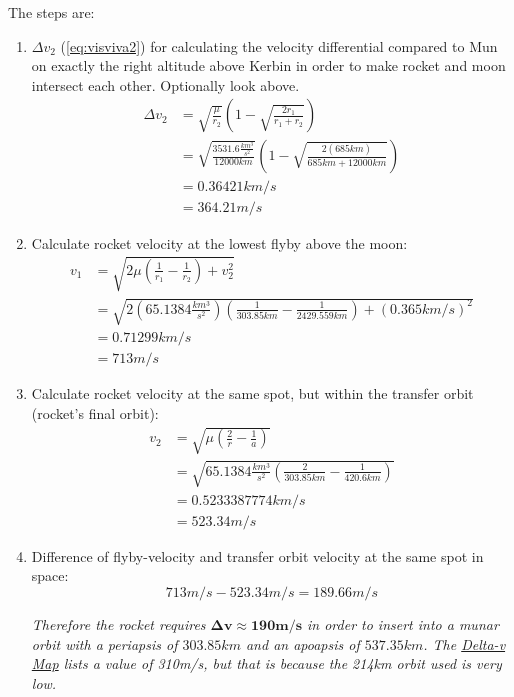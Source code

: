 \documentclass[12pt,paper=A4,numbers=noenddot,bibliography=totoc,listof=totoc,DIV=11,BCOR=1mm]{scrreprt}
\begin{document}
\begin{enumerate}
The steps are:\
	\begin{enumerate}
	\item $\Delta v_{2}$ (\ref{eq:visviva2}) for calculating the velocity differential compared to Mun on exactly the right altitude above Kerbin in order to make rocket and moon intersect each other. Optionally look above.
	\begin{equation*}
	\begin{split}
	\Delta v_{2} &= \sqrt{\frac{\mu}{r_{2}}} \left( 1-\sqrt{\frac{2r_{1}}{r_{1}+r_{2}}} \right) \\
	             &= \sqrt{\frac{3531.6 \frac{km^{3}}{s^{2}}}{12000km}} \left( 1-\sqrt{\frac{2(685km)}{685km+12000km}} \right) \\
	             &= 0.36421 km/s \\
	             &= 364.21 m/s
	\end{split}
	\end{equation*}
	\item Calculate rocket velocity at the lowest flyby above the moon:
	\begin{equation}
	\begin{split}
	v_{1} &= \sqrt{2\mu \left( \frac{1}{r_{1}} - \frac{1}{r_{2}} \right) + v_{2}^{2} }\\
	      &= \sqrt{2(65.1384 \frac{km^{3}}{s^{2}}) \left( \frac{1}{303.85km} - \frac{1}{2429.559km} \right) + (0.365km/s)^{2} }\\
	      &= 0.71299 km/s \\
	      &= 713 m/s
	\end{split}
	\end{equation}
	\item Calculate rocket velocity at the same spot, but within the transfer orbit (rocket's final orbit):
	\begin{equation*}
	\begin{split}
	v_{2} &= \sqrt{\mu \left( \frac{2}{r} - \frac{1}{a} \right) } \\
	      &= \sqrt{65.1384 \frac{km^{3}}{s^{2}} \left( \frac{2}{303.85km} - \frac{1}{420.6km} \right) } \\
	      &= 0.5233387774 km/s \\
	      &= 523.34 m/s
	\end{split}
	\end{equation*}
	\item Difference of flyby-velocity and transfer orbit velocity at the same spot in space:
	$$
	713 m/s - 523.34 m/s = 189.66 m/s
	$$
	
	\emph{Therefore the rocket requires $\mathbf{\Delta v \approx 190 m/s}$ in order to insert into a munar orbit with a periapsis of $303.85km$ and an apoapsis of $537.35km$. The \href{https://wiki.kerbalspaceprogram.com/wiki/File:KerbinDeltaVMap.png}{Delta-v Map} lists a value of 310m/s, but that is because the 214km orbit used is very low.}
	\end{enumerate}
	
\end{enumerate}
\bigskip
\end{document}
